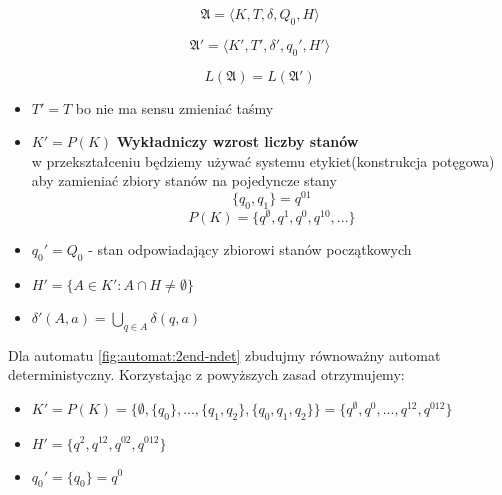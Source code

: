 \documentclass{../notatki}
\begin{document}
$$
\mathfrak{A} = \langle K,T,\delta,Q_0,H \rangle
$$

$$
\mathfrak{A}' = \langle K',T',\delta',q_0',H' \rangle
$$

$$
L(\mathfrak{A}) = L(\mathfrak{A}')
$$

\begin{itemize}
  \item $T' = T$ bo nie ma sensu zmieniać taśmy
  \item $K' = P(K)$ \textbf{Wykładniczy wzrost liczby stanów}\\
    w przekształceniu będziemy używać systemu etykiet(konstrukcja
    potęgowa) aby zamieniać zbiory stanów na pojedyncze stany
    $$
    \{q_0,q_1\} = q^{01}
    $$
    $$
    P(K) = \{q^\emptyset, q^1, q^0, q^{10}, ...\}
    $$
  \item $q_0' = Q_0$ - stan odpowiadający zbiorowi stanów początkowych
  \item $H' = \{A \in K' : A \cap H \ne \emptyset\}$
  \item $\delta'(A, a) = \bigcup_{q \in A}\delta(q, a)$
\end{itemize}
Dla automatu \ref{fig:automat:2end-ndet} zbudujmy równoważny automat
deterministyczny.
Korzystając z powyższych zasad otrzymujemy:

\begin{itemize}
  \item $K' = P(K) = \{\emptyset, \{q_0\}, ..., \{q_1, q_2\}, \{q_0,
    q_1, q_2\}\} = \{q^\emptyset, q^0, ..., q^{12}, q^{012}\}$
  \item $H' = \{q^2, q^{12}, q^{02}, q^{012}\}$
  \item $q_0' = \{q_0\} = q^0$
\end{itemize}
\end{document}
